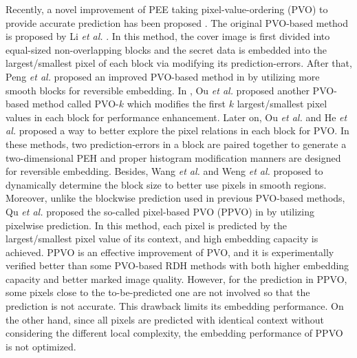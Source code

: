 \documentclass[review,3p,10pt,sort&compress]{elsarticle}
\begin{document}
Recently, a novel improvement of PEE taking pixel-value-ordering (PVO) to provide accurate prediction has been proposed \cite{
Li2013PVO,
Peng2014IPVO,
Ou2014PVOk,
Qu2015PPVO,
Xiang2015A,
Bo2016Improved,
Weng2016Reversible,
Weng2017Optimal,
He2018Reversible,
Kim2018Skewed}.
The original PVO-based method is proposed by Li \emph{et al.} \cite{Li2013PVO}. In this method, the cover image is first divided into equal-sized non-overlapping blocks and the secret data is embedded into the largest/smallest pixel of each block via modifying its prediction-errors.
After that, Peng \emph{et al.} proposed an improved PVO-based method in \cite{Peng2014IPVO} by utilizing more smooth blocks for reversible embedding. In \cite{Ou2014PVOk}, Ou \emph{et al.} proposed another PVO-based method called PVO-$k$ which modifies the first $k$ largest/smallest pixel values in each block for performance enhancement.
Later on, Ou \emph{et al.} \cite{Bo2016Improved} and He \emph{et al.} \cite{He2018Reversible} proposed a way to better explore the pixel relations in each block for PVO. In these methods, two prediction-errors in a block are paired together to generate a two-dimensional PEH and proper histogram modification manners are designed for reversible embedding.
Besides, Wang \emph{et al.} \cite{Xiang2015A} and Weng \emph{et al.} \cite{Weng2016Reversible} proposed to dynamically determine the block size to better use pixels in smooth regions.
Moreover, unlike the blockwise prediction used in previous PVO-based methods, Qu \emph{et al.} proposed the so-called pixel-based PVO (PPVO) in \cite{Qu2015PPVO} by utilizing pixelwise prediction. In this method, each pixel is predicted by the largest/smallest pixel value of its context, and high embedding capacity is achieved.
PPVO is an effective improvement of PVO, and it is experimentally verified better than some PVO-based RDH methods with both higher embedding capacity and better marked image quality.
However, for the prediction in PPVO, some pixels close to the to-be-predicted one are not involved so that the prediction is not accurate. This drawback limits its embedding performance. On the other hand, since all pixels are predicted with identical context without considering the different local complexity, the embedding performance of PPVO is not optimized.
\end{document}
